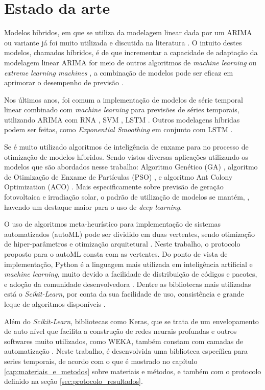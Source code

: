 \chapter{Estado da arte}
\label{cap:estado_da_arte}

Modelos híbridos, em que se utiliza da modelagem linear dada por um ARIMA ou variante já foi muito utilizada e discutida na literatura \cite{zhang2003time, khashei2010artificial, babu2014moving, de2014hybrid, de2016hybrid, domingos2019intelligent}. O intuito destes modelos, chamados híbridos, é de que incrementar a capacidade de adaptação da modelagem linear ARIMA for meio de outros algoritmos de \textit{machine learning} ou \textit{extreme learning machines} \cite{yu2020hybrid}, a combinação de modelos pode ser eficaz em aprimorar o desempenho de previsão \cite{khashei2012new}.

Nos últimos anos, foi comum a implementação de modelos de série temporal linear combinado com \textit{machine learning} para previsões de séries temporais, utilizando ARIMA com RNA \cite{xiong2017hybrid}, SVM \cite{domingos2019intelligent}, LSTM \cite{choi2018stock}. Outros modelagens híbridas podem ser feitas, como \textit{Exponential Smoothing} em conjunto com LSTM \cite{smyl2020hybrid}.

Se é muito utilizado algoritmos de inteligência de enxame para no processo de otimização de modelos híbridos. Sendo vistos diversas aplicações utilizando os modelos que são abordados nesse trabalho: Algoritmo Genético (GA) \cite{huang2012hybrid}, algoritmo de Otimização de Enxame de Partículas (PSO) \cite{bagheri2014financial, pradeepkumar2017forecasting}, e algoritmo Ant Colony Optimization (ACO) \cite{shen2013optimal}. Mais especificamente sobre previsão de geração fotovoltaica e irradiação solar, o padrão de utilização de modelos se mantém, \cite{sobri2018solar, wang2019review}, havendo um destaque maior para o uso de \textit{deep learning}.

O uso de algoritmos meta-heurístico para implementação de sistemas automatizados (autoML) pode ser dividido em duas vertentes, sendo otimização de hiper-parâmetros e otimização arquitetural \cite{he2021automl}. Neste trabalho, o protocolo proposto para o autoML consta com as vertentes. Do ponto de vista de implementação, Python é a linguagem mais utilizada em inteligência artificial e \textit{machine learning}, muito devido a facilidade de distribuição de códigos e pacotes, e adoção da comunidade desenvolvedora \cite{blank2020pymoo}. Dentre as bibliotecas mais utilizadas está o \textit{Scikit-Learn}, por conta da sua facilidade de uso, consistência e grande leque de algoritmos disponíveis \cite{scikit-learn, hackeling2017mastering}. 

Além do \textit{Scikit-Learn}, bibliotecas como Keras, que se trata de um envelopamento de auto nível que facilita a construção de redes neurais profundas \cite{jin2019auto} e outros softwares muito utilizados, como WEKA, também constam com camadas de automatização \cite{feurer2020auto}. Neste trabalho, é desenvolvida uma biblioteca específica para series temporais, de acordo com o que é mostrado no capítulo \ref{cap:materiais_e_metodos} sobre materiais e métodos, e também com o protocolo definido na seção \ref{sec:protocolo_resultados}.